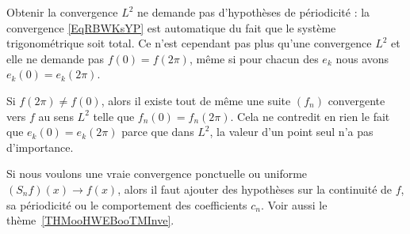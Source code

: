 \begin{normaltext}
	Obtenir la convergence \( L^2\) ne demande pas d'hypothèses de périodicité : la convergence \eqref{EqRBWKsYP} est automatique du fait que le système trigonométrique soit total. Ce n'est cependant pas plus qu'une convergence \( L^2\) et elle ne demande pas \( f(0)=f(2\pi)\), même si pour chacun des \( e_k\) nous avons \( e_k(0)=e_k(2\pi)\).

	Si \( f(2\pi)\neq f(0)\), alors il existe tout de même une suite \( (f_n)\) convergente vers \( f\) au sens \( L^2\) telle que \( f_n(0)=f_n(2\pi)\). Cela ne contredit en rien le fait que \( e_k(0)=e_k(2\pi)\) parce que dans \( L^2\), la valeur d'un point seul n'a pas d'importance.

	Si nous voulons une vraie convergence ponctuelle ou uniforme \( (S_nf)(x)\to f(x)\), alors il faut ajouter des hypothèses sur la continuité de \( f\), sa périodicité ou le comportement des coefficients \( c_n\). Voir aussi le thème~\ref{THMooHWEBooTMInve}.
\end{normaltext}

